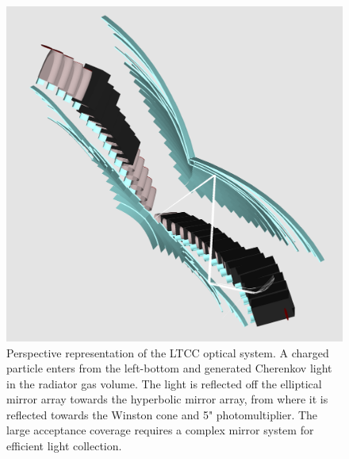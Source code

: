 \documentclass[final,3p,twocolumn]{elsarticle}
\begin{document}
\begin{figure}[htbp!]
\centerline{\includegraphics[width=1.0\columnwidth]{ltcc-mod6.png}}
\caption{ Perspective representation of the LTCC optical system. A charged particle enters from the left-bottom and generated 
Cherenkov light in the radiator gas volume. The
light is reflected off the elliptical mirror array towards the hyperbolic mirror array, from where it is reflected towards the Winston cone and 
5" photomultiplier.  
The large acceptance coverage requires a complex mirror system for efficient light collection. }
\label{ltcc}
\end{figure}
\end{document}
